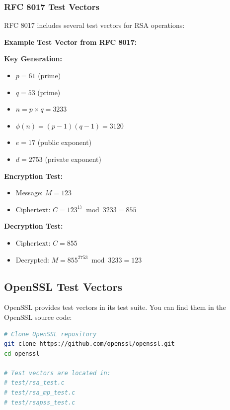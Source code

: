 \documentclass[11pt,a4paper]{article}
\begin{document}
\subsubsection{RFC 8017 Test Vectors}

RFC 8017 includes several test vectors for RSA operations:

\begin{examplebox}
\textbf{Example Test Vector from RFC 8017:}

\textbf{Key Generation:}
\begin{itemize}
    \item $p = 61$ (prime)
    \item $q = 53$ (prime)
    \item $n = p \times q = 3233$
    \item $\phi(n) = (p-1)(q-1) = 3120$
    \item $e = 17$ (public exponent)
    \item $d = 2753$ (private exponent)
\end{itemize}

\textbf{Encryption Test:}
\begin{itemize}
    \item Message: $M = 123$
    \item Ciphertext: $C = 123^{17} \bmod 3233 = 855$
\end{itemize}

\textbf{Decryption Test:}
\begin{itemize}
    \item Ciphertext: $C = 855$
    \item Decrypted: $M = 855^{2753} \bmod 3233 = 123$
\end{itemize}
\end{examplebox}

\subsection{OpenSSL Test Vectors}

OpenSSL provides test vectors in its test suite. You can find them in the OpenSSL source code:

\begin{lstlisting}[language=bash, caption=OpenSSL Test Vector Location]
# Clone OpenSSL repository
git clone https://github.com/openssl/openssl.git
cd openssl

# Test vectors are located in:
# test/rsa_test.c
# test/rsa_mp_test.c
# test/rsapss_test.c
\end{lstlisting}
\end{document}
